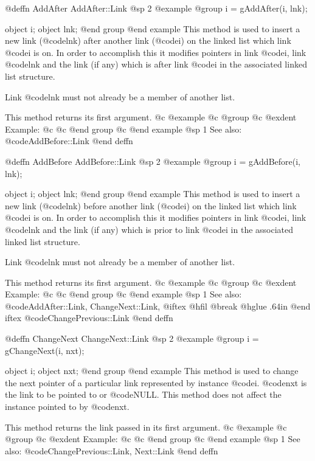 @deffn {AddAfter} AddAfter::Link
@sp 2
@example
@group
i = gAddAfter(i, lnk);

object  i;
object  lnk;
@end group
@end example
This method is used to insert a new link (@code{lnk}) after another
link (@code{i}) on the linked list which link @code{i} is on.  In order
to accomplish this it modifies pointers in link @code{i}, link
@code{lnk} and the link (if any) which is after link @code{i} in
the associated linked list structure.

Link @code{lnk} must not already be a member of another list.

This method returns its first argument.
@c @example
@c @group
@c @exdent Example:
@c 
@c @end group
@c @end example
@sp 1
See also:  @code{AddBefore::Link}
@end deffn







@deffn {AddBefore} AddBefore::Link
@sp 2
@example
@group
i = gAddBefore(i, lnk);

object  i;
object  lnk;
@end group
@end example
This method is used to insert a new link (@code{lnk}) before another
link (@code{i}) on the linked list which link @code{i} is on.  In order
to accomplish this it modifies pointers in link @code{i}, link
@code{lnk} and the link (if any) which is prior to link @code{i} in
the associated linked list structure.

Link @code{lnk} must not already be a member of another list.

This method returns its first argument.
@c @example
@c @group
@c @exdent Example:
@c 
@c @end group
@c @end example
@sp 1
See also:  @code{AddAfter::Link, ChangeNext::Link,}
@iftex
@hfil @break @hglue .64in      
@end iftex
@code{ChangePrevious::Link}
@end deffn








@deffn {ChangeNext} ChangeNext::Link
@sp 2
@example
@group
i = gChangeNext(i, nxt);

object  i;
object  nxt;
@end group
@end example
This method is used to change the next pointer of a particular link
represented by instance @code{i}.  @code{nxt} is the link to be pointed
to or @code{NULL}.  This method does not affect the instance pointed to
by @code{nxt}.

This method returns the link passed in its first argument.
@c @example
@c @group
@c @exdent Example:
@c 
@c @end group
@c @end example
@sp 1
See also:  @code{ChangePrevious::Link, Next::Link}
@end deffn





